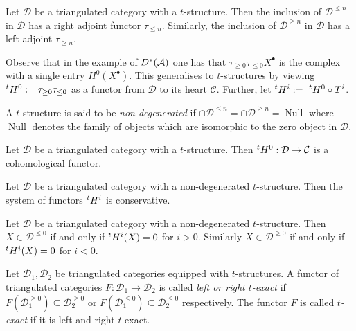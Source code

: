 \begin{proposition}{\cite[Proposition 5.1.4.]{dimca2004sheaves}}
 Let $\mathcal{D}$ be a triangulated category with a $t$-structure.
 Then the inclusion of $\mathcal{D}^{\leq n}$ in $\mathcal{D}$ has a right adjoint functor $\tau_{\leq n}$.
 Similarly, the inclusion of $\mathcal{D}^{\geq n}$ in $\mathcal{D}$ has a left adjoint $\tau_{\geq n}$.
\end{proposition}
Observe that in the example of $D^*(\AA)$ one has that $\tau_{\geq 0} \tau_{\leq 0} X^\bullet$ is the complex with a single entry $H^0(X^\bullet)$.
This generalises to $t$-structures by viewing $\tH^0:= \tau_{\geq 0}\tau_{\leq 0}$ as a functor from $\mathcal{D}$ to its heart $\mathcal{C}$.
Further, let $\tH^i:=\ \tH^0 \circ T^i$.
\begin{definition}
 A $t$-structure is said to be {\it non-degenerated} if $\cap \mathcal{D}^{\leq n} = \cap \mathcal{D}^{\geq n}= \operatorname{Null}$ where $\operatorname{Null}$ denotes the family of objects which are isomorphic to the zero object in $\mathcal{D}$.
\end{definition}
\begin{proposition}{\cite[Proposition 5.1.6.]{dimca2004sheaves}}
 Let $\mathcal{D}$ be a triangulated category with a $t$-structure. Then $\tH^0:\mathcal{D}\to \mathcal{C}$ is a cohomological functor.
\end{proposition}
\begin{proposition}{\cite[Proposition 5.1.7.]{dimca2004sheaves}}
 Let $\mathcal{D}$ be a triangulated category with a non-degenerated $t$-structure. Then the system of functors $\tH^i$ is conservative.
\end{proposition}
\begin{proposition}{\cite[Proposition 5.1.7.]{dimca2004sheaves}}\label{prop: tStructCohomD}
  Let $\mathcal{D}$ be a triangulated category with a non-degenerated $t$-structure.
  Then $X\in \mathcal{D}^{\leq 0}$ if and only if $\tH^i(X) = 0$ for $i>0$. Similarly $X\in \mathcal{D}^{\geq 0}$ if and only if $\tH^i(X)= 0$ for $i<0$.
\end{proposition}
\begin{definition}
 Let $\mathcal{D}_1,\mathcal{D}_2$ be triangulated categories equipped with $t$-structures. A functor of triangulated categories $F:\mathcal{D}_1\to \mathcal{D}_2$ is called {\it left or right $t$-exact} if $F(\mathcal{D}_1^{\geq 0}) \subseteq \mathcal{D}_2^{\geq 0}$ or $F(\mathcal{D}_1^{\leq 0}) \subseteq \mathcal{D}_2^{\leq 0}$ respectively.
 The functor $F$ is called {\it $t$-exact} if it is left and right $t$-exact.
\end{definition}

